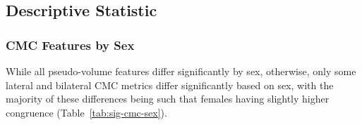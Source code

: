 \documentclass{article}
\begin{document}


\subsection{Descriptive Statistic}

\subsubsection{CMC Features by Sex}

While all pseudo-volume features differ significantly by sex, otherwise,
only some lateral and bilateral CMC metrics differ significantly based on
sex, with the majority of these differences being such that females having
slightly higher congruence (Table~\ref{tab:sig-cmc-sex}).
\end{document}

